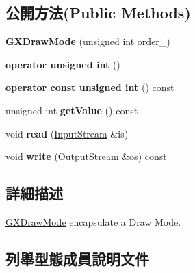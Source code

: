\subsection*{公開方法(Public Methods)}
\begin{DoxyCompactItemize}
\item 
{\bfseries G\+X\+Draw\+Mode} (unsigned int order\+\_)\hypertarget{class_i_dream_sky_1_1_g_x_draw_mode_a780de3dd815361dc0531d06e57974b38}{}\label{class_i_dream_sky_1_1_g_x_draw_mode_a780de3dd815361dc0531d06e57974b38}

\item 
{\bfseries operator unsigned int} ()\hypertarget{class_i_dream_sky_1_1_g_x_draw_mode_a739431891fec9fb9d7076b96756c5858}{}\label{class_i_dream_sky_1_1_g_x_draw_mode_a739431891fec9fb9d7076b96756c5858}

\item 
{\bfseries operator const unsigned int} () const \hypertarget{class_i_dream_sky_1_1_g_x_draw_mode_ada83205b8fa9e1f457b2b89587b8b198}{}\label{class_i_dream_sky_1_1_g_x_draw_mode_ada83205b8fa9e1f457b2b89587b8b198}

\item 
unsigned int {\bfseries get\+Value} () const \hypertarget{class_i_dream_sky_1_1_g_x_draw_mode_a228359225d6208566c0f5ff583149db4}{}\label{class_i_dream_sky_1_1_g_x_draw_mode_a228359225d6208566c0f5ff583149db4}

\item 
void {\bfseries read} (\hyperlink{class_i_dream_sky_1_1_input_stream}{Input\+Stream} \&is)\hypertarget{class_i_dream_sky_1_1_g_x_draw_mode_ae6e616aa2362aaf3598a552c687815b0}{}\label{class_i_dream_sky_1_1_g_x_draw_mode_ae6e616aa2362aaf3598a552c687815b0}

\item 
void {\bfseries write} (\hyperlink{class_i_dream_sky_1_1_output_stream}{Output\+Stream} \&os) const \hypertarget{class_i_dream_sky_1_1_g_x_draw_mode_aab632b58fb71ce74048b0cbe15e99891}{}\label{class_i_dream_sky_1_1_g_x_draw_mode_aab632b58fb71ce74048b0cbe15e99891}

\end{DoxyCompactItemize}


\subsection{詳細描述}
\hyperlink{class_i_dream_sky_1_1_g_x_draw_mode}{G\+X\+Draw\+Mode} encapsulate a Draw Mode. 

\subsection{列舉型態成員說明文件}
